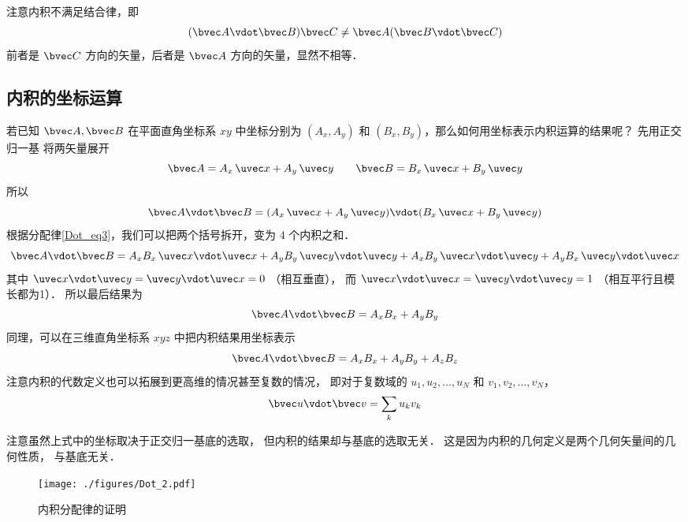 注意内积不满足结合律，即
\begin{equation}
(\bvec A \vdot \bvec B) \bvec C \ne  \bvec A (\bvec B \vdot \bvec C)
\end{equation}
前者是 $\bvec C$ 方向的矢量，后者是 $\bvec A$ 方向的矢量，显然不相等．

\subsection{内积的坐标运算}
若已知 $\bvec A, \bvec B$ 在平面直角坐标系 $xy$ 中坐标分别为 $(A_x, A_y)$ 和  $(B_x, B_y)$，那么如何用坐标表示内积运算的结果呢？ 先用正交归一基 将两矢量展开 %
\begin{equation}
\bvec A = A_x \,\uvec x + A_y \,\uvec y \qquad \bvec B = B_x \,\uvec x + B_y \,\uvec y
\end{equation}
所以
\begin{equation}
\bvec A \vdot \bvec B = (A_x \,\uvec x + A_y \,\uvec y) \vdot (B_x \,\uvec x + B_y \,\uvec y)
\end{equation}
根据分配律\autoref{Dot_eq3}，我们可以把两个括号拆开，变为 4 个内积之和． 
\begin{equation}
\bvec A \vdot \bvec B = A_x B_x \,\uvec x \vdot \uvec x + A_y B_y \,\uvec y \vdot \uvec y + A_x B_y \,\uvec x \vdot \uvec y + A_y B_x \,\uvec y \vdot \uvec x
\end{equation}
其中 $\uvec x \vdot \uvec y = \uvec y \vdot \uvec x = 0$ （相互垂直）， 而 $\uvec x \vdot \uvec x = \uvec y \vdot \uvec y = 1$ （相互平行且模长都为1）． 所以最后结果为
\begin{equation}
\bvec A \vdot \bvec B = A_x B_x + A_y B_y
\end{equation}
同理，可以在三维直角坐标系 $xyz$ 中把内积结果用坐标表示
\begin{equation}\label{Dot_eq4}
\bvec A \vdot \bvec B = A_x B_x + A_y B_y + A_z B_z	
\end{equation}
注意内积的代数定义也可以拓展到更高维的情况甚至复数的情况， 即对于复数域的 $u_1, u_2, \dots, u_N$ 和 $v_1, v_2, \dots, v_N$，
\begin{equation}
\bvec u \vdot \bvec v = \sum_k u_k v_k
\end{equation}

注意虽然上式中的坐标取决于正交归一基底的选取， 但内积的结果却与基底的选取无关． 这是因为内积的几何定义是两个几何矢量间的几何性质， 与基底无关．

\begin{figure}[ht]
\centering
\texttt{[image: ./figures/Dot\_2.pdf]}
\caption{内积分配律的证明} \label{Dot_fig2}
\end{figure}

